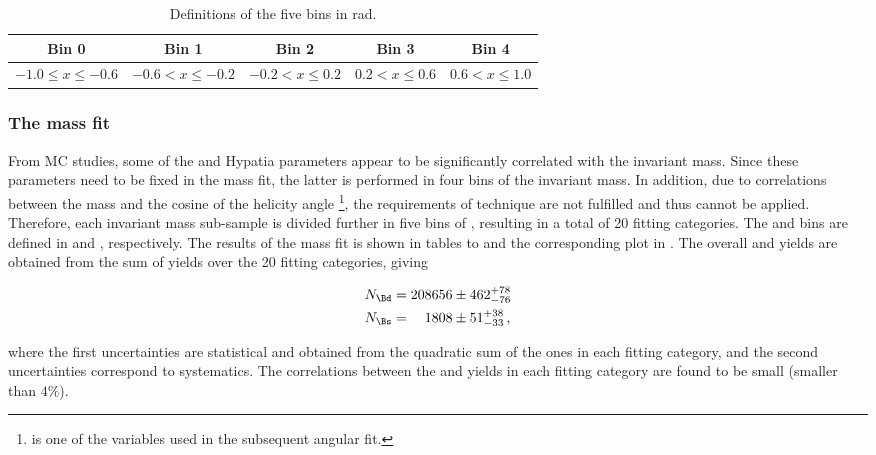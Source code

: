 \begin{table}[!h]
\begin{tabular}{c|c|c|c|c}
\hline
 Bin 0 & Bin 1 & Bin 2 & Bin 3 & Bin 4\\	
\hline
\multirow{2}{*}{$ -1.0 \leq x \leq -0.6 $} & \multirow{2}{*}{$ -0.6 < x \leq -0.2 $} & \multirow{2}{*}{$ -0.2 < x \leq 0.2 $}& \multirow{2}{*}{$ 0.2 < x \leq 0.6 $} & \multirow{2}{*}{$ 0.6 < x \leq 1.0 $} \\
					      	 					  &   &	& & \\	
\hline
 \end{tabular}
\caption{Definitions of the five \cosTmu bins in rad.}
\label{cosThateMubindef} 
\end{table}

\subsubsection{The mass fit}
From MC studies, some of the \Bs and \Bd Hypatia parameters appear to be significantly correlated with the \mkpi invariant mass. 
Since these parameters need to be fixed in the mass fit, the latter is performed in four bins of the
\mkpi invariant mass. In addition, due to correlations between the mass and the cosine of the helicity angle \thetamu\footnote{\cosTmu is one of 
the variables used in the subsequent angular fit.},
the requirements of \sPlot technique are not fulfilled and thus cannot be applied. Therefore, each \mkpi invariant mass sub-sample
is divided further in five bins of \cosTmu, resulting in a total of 20 fitting categories. The \mkpi and \cosTmu bins are defined 
in  and , respectively. The results of the mass fit is shown in tables 
to  and the corresponding plot in . The overall \Bs and \Bd yields are obtained from the sum 
of yields over the 20 fitting categories, giving

\begin{align}
N_{\Bd} &= 208656  \pm  462 ^{+ 78	}_{- 76}\\
N_{\Bs} &= \phantom{00}1808  \pm   51 ^{+ 38	}_{- 33} \, ,
\end{align}

\noindent where the first uncertainties are statistical and obtained from the quadratic sum of the ones in each fitting category, 
and the second uncertainties correspond to systematics. The correlations between the \Bd and \Bs yields in each fitting category
are found to be small (smaller than $4\%$).

